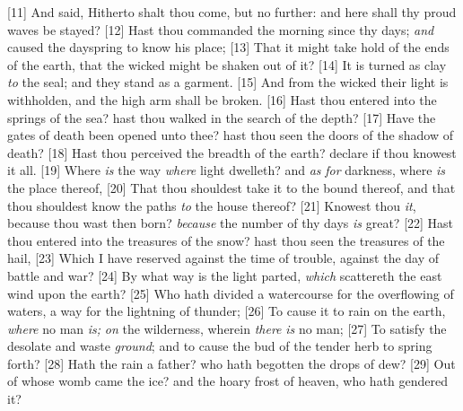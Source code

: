 [11] \textcolor[cmyk]{0.99998,1,0,0}{And said, Hitherto shalt thou come, but no further: and here shall thy proud waves be stayed?}
[12] \textcolor[cmyk]{0.99998,1,0,0}{Hast thou commanded the morning since thy days; \emph{and} caused the dayspring to know his place;}
[13] \textcolor[cmyk]{0.99998,1,0,0}{That it might take hold of the ends of the earth, that the wicked might be shaken out of it?}
[14] \textcolor[cmyk]{0.99998,1,0,0}{It is turned as clay \emph{to} the seal; and they stand as a garment.}
[15] \textcolor[cmyk]{0.99998,1,0,0}{And from the wicked their light is withholden, and the high arm shall be broken.}
[16] \textcolor[cmyk]{0.99998,1,0,0}{Hast thou entered into the springs of the sea?  hast thou walked in the search of the depth?}
[17] \textcolor[cmyk]{0.99998,1,0,0}{Have the gates of death been opened unto thee?  hast thou seen the doors of the shadow of death?}
[18] \textcolor[cmyk]{0.99998,1,0,0}{Hast thou perceived the breadth of the earth? declare if thou knowest it all.}
[19] \textcolor[cmyk]{0.99998,1,0,0}{Where \emph{is} the way \emph{where} light dwelleth? and \emph{as} \emph{for} darkness, where \emph{is} the place thereof,}
[20] \textcolor[cmyk]{0.99998,1,0,0}{That thou shouldest take it to the bound thereof, and that thou shouldest know the paths \emph{to} the house thereof?}
[21] \textcolor[cmyk]{0.99998,1,0,0}{Knowest thou \emph{it}, because thou wast then born?  \emph{because} the number of thy days \emph{is} great?}
[22] \textcolor[cmyk]{0.99998,1,0,0}{Hast thou entered into the treasures of the snow?  hast thou seen the treasures of the hail,}
[23] \textcolor[cmyk]{0.99998,1,0,0}{Which I have reserved against the time of trouble, against the day of battle and war?}
[24] \textcolor[cmyk]{0.99998,1,0,0}{By what way is the light parted, \emph{which} scattereth the east wind upon the earth?}
[25] \textcolor[cmyk]{0.99998,1,0,0}{Who hath divided a watercourse for the overflowing of waters,  a way for the lightning of thunder;}
[26] \textcolor[cmyk]{0.99998,1,0,0}{To cause it to rain on the earth, \emph{where} no man \emph{is;} \emph{on} the wilderness, wherein \emph{there} \emph{is} no man;}
[27] \textcolor[cmyk]{0.99998,1,0,0}{To satisfy the desolate and waste \emph{ground}; and to cause the bud of the tender herb to spring forth?}
[28] \textcolor[cmyk]{0.99998,1,0,0}{Hath the rain a father?  who hath begotten the drops of dew?}
[29] \textcolor[cmyk]{0.99998,1,0,0}{Out of whose womb came the ice? and the hoary frost of heaven, who hath gendered it?}
